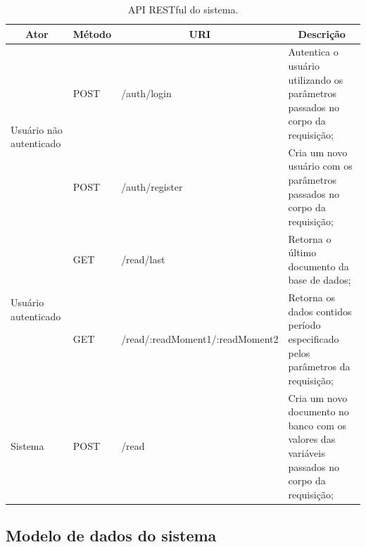 \begin{table}[!h]
\huge
\centering
\caption{\label{tab:api} API RESTful do sistema.}
\begin{adjustbox}{max width=\textwidth}
\begin{tabular}{@{} p{8.5cm} l l p{10cm} @{}}
\hline
\multicolumn{1}{c}{\textbf{Ator}}                             & \multicolumn{1}{c}{\textbf{Método}} & \multicolumn{1}{c}{\textbf{URI}}                 & \multicolumn{1}{c}{\textbf{Descrição}}                                                    \\ \hline
\multicolumn{1}{l|}{\multirow{2}{*}{Usuário não autenticado}} & POST                                & \multicolumn{1}{l|}{/auth/login}                 & Autentica o usuário utilizando os parâmetros passados no corpo da requisição;                                                                      \\ \cline{2-4} 
\multicolumn{1}{l|}{}                                         & POST                                & \multicolumn{1}{l|}{/auth/register}              & Cria um novo usuário com os parâmetros passados no corpo da requisição;                   \\ \hline
\multicolumn{1}{l|}{\multirow{2}{*}{Usuário autenticado}}     & GET                                 & \multicolumn{1}{l|}{/read/last}                  & Retorna o último documento da base de dados;                                              \\ \cline{2-4} 
\multicolumn{1}{l|}{}                                         & GET                                 & \multicolumn{1}{l|}{/read/:readMoment1/:readMoment2} & Retorna os dados contidos período especificado pelos parâmetros da requisição;                                           \\ \hline
\multicolumn{1}{l|}{Sistema}                                  & POST                                & \multicolumn{1}{l|}{/read}                       & Cria um novo documento no banco com os valores das variáveis passados no corpo da requisição; \\ \hline                          
\end{tabular}
\end{adjustbox}
\end{table}





\subsection{Modelo de dados do sistema} \label{subsec:datamodel}

